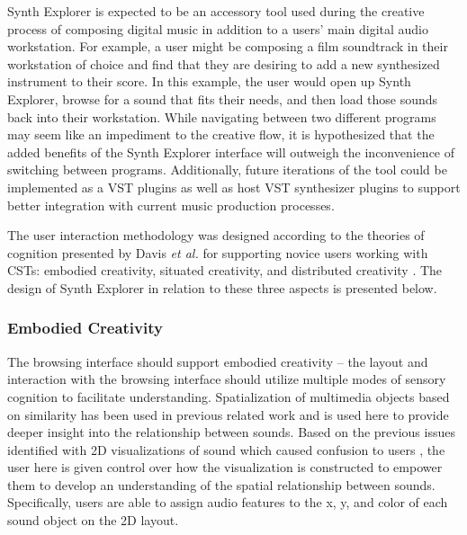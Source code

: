 Synth Explorer is expected to be an accessory tool used during the creative process of composing digital music in addition to a users' main digital audio workstation. For example, a user might be composing a film soundtrack in their workstation of choice and find that they are desiring to add a new synthesized instrument to their score. In this example, the user would open up Synth Explorer, browse for a sound that fits their needs, and then load those sounds back into their workstation. While navigating between two different programs may seem like an impediment to the creative flow, it is hypothesized that the added benefits of the Synth Explorer interface will outweigh the inconvenience of switching between programs. Additionally, future iterations of the tool could be implemented as a VST plugins as well as host VST synthesizer plugins to support better integration with current music production processes.

The user interaction methodology was designed according to the theories of cognition presented by Davis \textit{et al.} for supporting novice users working with CSTs: embodied creativity, situated creativity, and distributed creativity \cite{davis2013toward}. The design of Synth Explorer in relation to these three aspects is presented below.

\subsubsection{Embodied Creativity}
The browsing interface should support embodied creativity -- the layout and interaction with the browsing interface should utilize multiple modes of sensory cognition to facilitate understanding. Spatialization of multimedia objects based on similarity has been used in previous related work \cite{10.1145/3325480.3325506} and is used here to provide deeper insight into the relationship between sounds. Based on the previous issues identified with 2D visualizations of sound which caused confusion to users \cite{turquois2016exploring}, the user here is given control over how the visualization is constructed to empower them to develop an understanding of the spatial relationship between sounds. Specifically, users are able to assign audio features to the x, y, and color of each sound object on the 2D layout.

